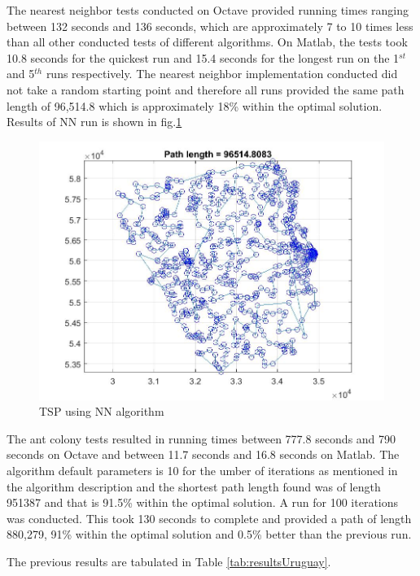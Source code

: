 \documentclass[twocolumn]{article}
\begin{document}
	The nearest neighbor tests conducted on Octave provided running times ranging between 132 seconds and 136 seconds, which are approximately 7 to 10 times less than all other conducted tests of different algorithms. On Matlab, the tests took 10.8 seconds for the quickest run and 15.4 seconds for the longest run on the 1$^{st}$ and 5$^{th}$ runs respectively. The nearest neighbor implementation conducted did not take a random starting point and therefore all runs provided the same path length of 96,514.8 which is approximately 18\%  within the optimal solution. Results of NN run is shown in fig.\ref{fig:NNalgorithm}
	
	\begin{figure}[h!]
		\centering
		\includegraphics[scale=0.25]{./NN.jpg}
		\caption{TSP using NN algorithm}
		\label{fig:NNalgorithm}
	\end{figure}
	
	The ant colony tests resulted in running times between 777.8 seconds and 790 seconds on Octave and between 11.7 seconds and 16.8 seconds on Matlab. The algorithm default parameters is 10 for the umber of iterations as mentioned in the algorithm description and the shortest path length found was of length 951387 and that is 91.5\% within the optimal solution. A run for 100 iterations was conducted. This took 130 seconds to complete and provided a path of length 880,279, 91\% within the optimal solution and 0.5\% better than the previous run.
	
	The previous results are tabulated in Table \ref{tab:resultsUruguay}.
	
\end{document}
